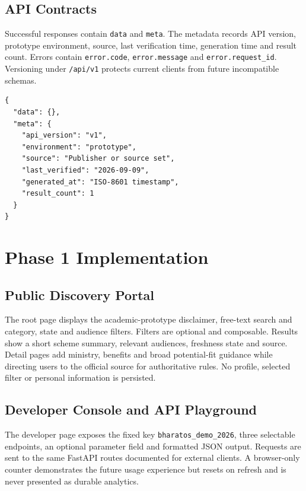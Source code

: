 \documentclass{tietreport}
\begin{document}
\section{API Contracts}
Successful responses contain \texttt{data} and \texttt{meta}. The metadata records API version,
prototype environment, source, last verification time, generation time and result count. Errors
contain \texttt{error.code}, \texttt{error.message} and \texttt{error.request\_id}. Versioning
under \texttt{/api/v1} protects current clients from future incompatible schemas.

\noindent\begin{minipage}{\linewidth}
\begin{verbatim}
{
  "data": {},
  "meta": {
    "api_version": "v1",
    "environment": "prototype",
    "source": "Publisher or source set",
    "last_verified": "2026-09-09",
    "generated_at": "ISO-8601 timestamp",
    "result_count": 1
  }
}
\end{verbatim}
\end{minipage}

\chapter{Phase 1 Implementation}

\section{Public Discovery Portal}
The root page displays the academic-prototype disclaimer, free-text search and category, state
and audience filters. Filters are optional and composable. Results show a short scheme summary,
relevant audiences, freshness state and source. Detail pages add ministry, benefits and broad
potential-fit guidance while directing users to the official source for authoritative rules.
No profile, selected filter or personal information is persisted.

\section{Developer Console and API Playground}
The developer page exposes the fixed key \texttt{bharatos\_demo\_2026}, three selectable
endpoints, an optional parameter field and formatted JSON output. Requests are sent to the same
FastAPI routes documented for external clients. A browser-only counter demonstrates the future
usage experience but resets on refresh and is never presented as durable analytics.
\end{document}
